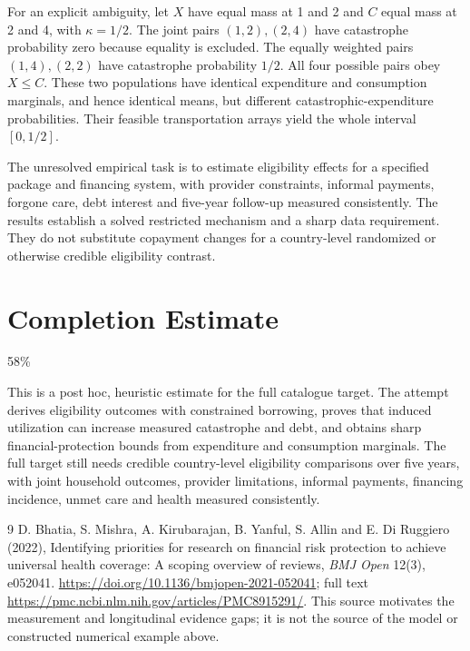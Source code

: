 \documentclass[11pt]{article}
\theoremstyle{remark}\newtheorem{remark}[theorem]{Remark}
\begin{document}
For an explicit ambiguity, let $X$ have equal mass at 1 and 2 and $C$ equal mass at 2 and 4, with $\kappa=1/2$. The joint pairs $(1,2),(2,4)$ have catastrophe probability zero because equality is excluded. The equally weighted pairs $(1,4),(2,2)$ have catastrophe probability $1/2$. All four possible pairs obey $X\le C$. These two populations have identical expenditure and consumption marginals, and hence identical means, but different catastrophic-expenditure probabilities. Their feasible transportation arrays yield the whole interval $[0,1/2]$.

The unresolved empirical task is to estimate eligibility effects for a specified package and financing system, with provider constraints, informal payments, forgone care, debt interest and five-year follow-up measured consistently. The results establish a solved restricted mechanism and a sharp data requirement. They do not substitute copayment changes for a country-level randomized or otherwise credible eligibility contrast.

\section{Completion Estimate}
58\%

This is a post hoc, heuristic estimate for the full catalogue target.
The attempt derives eligibility outcomes with constrained borrowing, proves that induced utilization can increase measured catastrophe and debt, and obtains sharp financial-protection bounds from expenditure and consumption marginals. The full target still needs credible country-level eligibility comparisons over five years, with joint household outcomes, provider limitations, informal payments, financing incidence, unmet care and health measured consistently.

\begin{thebibliography}{9}
 D. Bhatia, S. Mishra, A. Kirubarajan, B. Yanful, S. Allin and E. Di Ruggiero (2022), Identifying priorities for research on financial risk protection to achieve universal health coverage: A scoping overview of reviews, \emph{BMJ Open} 12(3), e052041. \url{https://doi.org/10.1136/bmjopen-2021-052041}; full text \url{https://pmc.ncbi.nlm.nih.gov/articles/PMC8915291/}. This source motivates the measurement and longitudinal evidence gaps; it is not the source of the model or constructed numerical example above.
\end{thebibliography}
\end{document}
